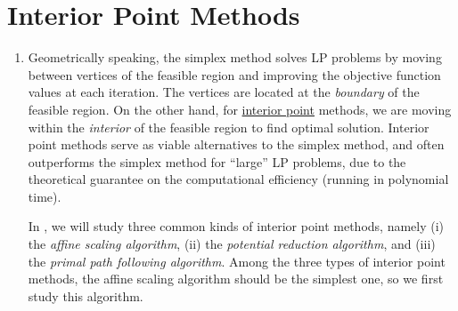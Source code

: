 \section{Interior Point Methods}
\label{sect:int-pt-methods}
\begin{enumerate}
\item Geometrically speaking, the simplex method solves LP problems by moving
between vertices of the feasible region and improving the objective function
values at each iteration. The vertices are located at the \emph{boundary} of the
feasible region. On the other hand, for \underline{interior point} methods, we are moving
within the \emph{interior} of the feasible region to find optimal solution. Interior
point methods serve as viable alternatives to the simplex method, and often
outperforms the simplex method for ``large'' LP problems, due to the theoretical
guarantee on the computational efficiency (running in polynomial time).

In , we will study three common kinds of interior
point methods, namely (i) the \emph{affine scaling algorithm}, (ii) the
\emph{potential reduction algorithm}, and (iii) the \emph{primal path following
algorithm}. Among the three types of interior point methods, the affine
scaling algorithm should be the simplest one, so we first study this algorithm.
\end{enumerate}
